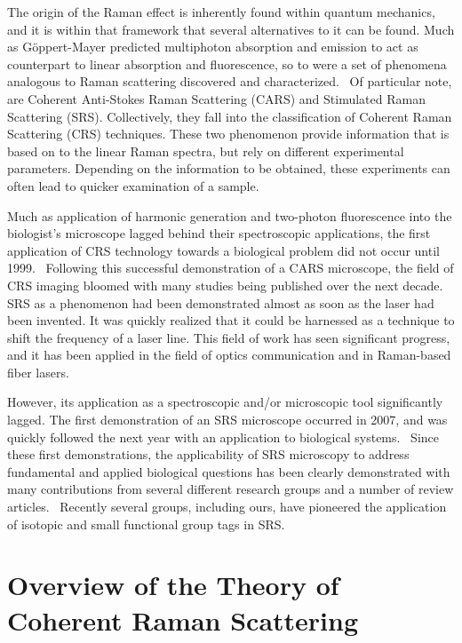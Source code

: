 The origin of the Raman effect is inherently found within quantum mechanics, and it is within that framework that several alternatives to it can be found. Much as G{\"o}ppert-Mayer predicted multiphoton absorption and emission to act as counterpart to linear absorption and fluorescence, so to were a set of phenomena analogous to Raman scattering discovered and characterized.~\cite{PhysRevLett.9.455, PhysRevLett.11.160, PhysRev.130.1850} Of particular note, are Coherent Anti-Stokes Raman Scattering (CARS) and Stimulated Raman Scattering (SRS). Collectively, they fall into the classification of Coherent Raman Scattering (CRS) techniques.  These two phenomenon provide information that is based on to the linear Raman spectra, but rely on different experimental parameters.  Depending on the information to be obtained, these experiments can often lead to quicker examination of a sample. 

Much as application of harmonic generation and two-photon fluorescence into the biologist's microscope lagged behind their spectroscopic applications, the first application of CRS technology towards a biological problem did not occur until 1999.~\cite{PhysRevLett.82.4142} Following this successful demonstration of a CARS microscope, the field of CRS imaging bloomed with many studies being published over the next decade.~\cite{Potma:2001aa, Cheng:2004aa, Evans:2008aa} SRS as a phenomenon had been demonstrated almost as soon as the laser had been invented. It was quickly realized that it could be harnessed as a technique to shift the frequency of a laser line. This field of work has seen significant progress, and it has been applied in the field of optics communication and in Raman-based fiber lasers.  

However, its application as a spectroscopic and/or microscopic tool significantly lagged. The first demonstration of an SRS microscope occurred in 2007, and was quickly followed the next year with an application to biological systems.~\cite{Ploetz2007, Freudiger1857}  Since these first demonstrations, the applicability of SRS microscopy to address fundamental and applied biological questions has been clearly demonstrated with many contributions from several different research groups and a number of review articles.~\cite{Prince:2017aa, C5CS00693G, FU201724}  Recently several groups, including ours, have pioneered the application of isotopic and small functional group tags in SRS.~\cite{C8AN00910D, Hou2503,Wei:2016aa, Alfonso-Garcia2015}

\section{Overview of the Theory of Coherent Raman Scattering}

